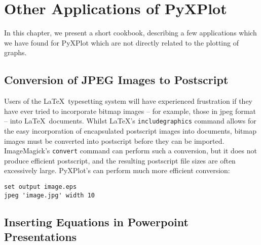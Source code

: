 %
%
%
%
%



\chapter{Other Applications of PyXPlot}

In this chapter, we present a short cookbook, describing a few applications
which we have found for PyXPlot which are not directly related to the plotting
of graphs.

\section{Conversion of JPEG Images to Postscript}

Users of the \LaTeX\ typesetting system will have experienced frustration if
they have ever tried to incorporate bitmap images -- for example, those in jpeg
format -- into \LaTeX\ documents. Whilst \LaTeX's {\tt includegraphics} command
allows for the easy incorporation of encapsulated postscript images into
documents, bitmap images must be converted into postscript before they can be
imported. ImageMagick's {\tt convert} command can perform
such a conversion, but it does not produce efficient postscript, and the
resulting postscript file sizes are often excessively large. PyXPlot's
 can perform much more efficient conversion:

\begin{verbatim}
set output image.eps
jpeg 'image.jpg' width 10
\end{verbatim}

\section{Inserting Equations in Powerpoint Presentations}

